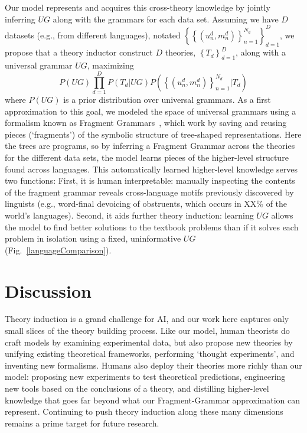 \documentclass[12pt]{article}
\begin{document}
Our model represents and acquires this cross-theory knowledge
by jointly inferring $UG$ along with the grammars for each data set.
Assuming we have $D$ datasets (e.g., from different languages),
notated $\left\{\left\{(u_n^d,m_n^d) \right\}_{n = 1}^{N_d} \right\}_{d = 1}^D$,
we propose that a
theory inductor construct $D$ theories, $\left\{T_d \right\}_{d = 1}^D$,
along with a universal grammar $UG$, maximizing
$$
P(UG)\prod_{d = 1}^D P(T_d|UG)P(\left\{(u_n^d,m_n^d) \right\}_{n = 1}^{N_d}|T_d)
$$
where $P(UG)$ is a prior distribution over universal grammars.
As a first approximation to this goal,
we modeled the space of universal grammars
using a formalism known as Fragment Grammars~\cite{tim},
which work by saving and reusing pieces (`fragments')
of the symbolic structure of tree-shaped representations.
Here the trees are programs,
so by inferring a Fragment Grammar across the theories for the different data sets,
the model learns
pieces of the higher-level structure
found across languages.
This automatically learned higher-level knowledge
serves two functions:
First, it is human interpretable:
manually inspecting the contents of the fragment grammar reveals
cross-language motifs previously discovered by linguists (e.g., word-final devoicing of obstruents,
which occurs in XX\% of the world's languages).
Second,
it aids further theory induction:
learning $UG$ allows the model to
find better solutions to the textbook problems than if it solves
each problem in isolation using a fixed,
uninformative $UG$ (Fig.~\ref{languageComparison}).



\section*{Discussion}

Theory induction is a grand challenge for AI,
and our work here
captures only small slices of
the theory building process.
Like our model, human theorists
do craft models
by examining experimental data,
but also propose new theories by
unifying existing theoretical frameworks,
performing `thought experiments',
and inventing new formalisms.
Humans also deploy their theories more richly than our model:
proposing new experiments to test theoretical predictions,
engineering new tools based on the conclusions of a theory,
and distilling higher-level knowledge that goes far beyond what our
Fragment-Grammar approximation can represent.
Continuing to push theory induction along these many dimensions 
remains a prime target for future research.
\end{document}
